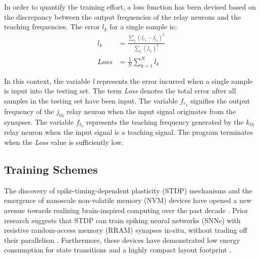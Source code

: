 \noindent In order to quantify the training effort, a loss function has been devised based on the discrepancy between the output frequencies of the relay neurons and the teaching frequencies. The error $l_k$ for a single sample is::
\begin{align}
l_k &= \frac{\sum_{j}^{}\left( f_{r_k} - f_{t_k} \right)^2}{\sum_{j}^{}\left( f_{t_k} \right)^2} \label{eq:6.16}\\
Loss &= \frac{1}{N}\sum_{k=1}^{N}l_k \label{eq:6.17}
\end{align}

\noindent In this context, the variable \textit{l} represents the error incurred when a single sample is input into the testing set. The term \textit{Loss} denotes the total error after all samples in the testing set have been input. The variable $f_{r_k}$ signifies the output frequency of the $j_{th}$ relay neuron when the input signal originates from the synapses. The variable $f_{t_k}$ represents the teaching frequency generated by the $k_{th}$ relay neuron when the input signal is a teaching signal. The program terminates when the \textit{Loss} value is sufficiently low.

\subsection[Training Schemes]{Training Schemes}


\noindent The discovery of spike-timing-dependent plasticity (STDP) mechanisms and the emergence of nanoscale non-volatile memory (NVM) devices have opened a new avenue towards realizing brain-inspired computing over the past decade \cite{zamarreno2011spike}. Prior research suggests that STDP can train spiking neural networks (SNNs) with resistive random-access memory (RRAM) synapses in-situ, without trading off their parallelism \cite{querlioz2012bioinspired}. Furthermore, these devices have demonstrated low energy consumption for state transitions and a highly compact layout footprint \cite{yu2011electronic}.\\

